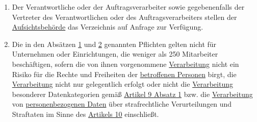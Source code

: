 \begin{enumerate}
  \item Der Verantwortliche oder der Auftragsverarbeiter sowie gegebenenfalls der Vertreter des Verantwortlichen oder
   des Auftragsverarbeiters stellen der \hyperref[itm:04-21]{Aufsichtsbehörde} das Verzeichnis auf Anfrage zur Verfügung.
  \label{itm:30-4}

  \item Die in den Absätzen \hyperref[itm:30-1]{1} und \hyperref[itm:30-2]{2} genannten Pflichten gelten nicht für
   Unternehmen oder Einrichtungen, die weniger als 250 Mitarbeiter beschäftigen, sofern die von ihnen vorgenommene
   \hyperref[itm:04-2]{Verarbeitung} nicht ein Risiko für die Rechte und Freiheiten der \hyperref[itm:04-1]{betroffenen Personen} birgt, die \hyperref[itm:04-2]{Verarbeitung} nicht
   nur gelegentlich erfolgt oder nicht die \hyperref[itm:04-2]{Verarbeitung} besonderer Datenkategorien gemäß \hyperref[itm:09-1]{Artikel 9
   Absatz 1} bzw. die  \hyperref[itm:04-2]{Verarbeitung} von \hyperref[itm:04-1]{personenbezogenen Daten} über strafrechtliche Verurteilungen und Straftaten im
   Sinne des \hyperref[ch:10]{Artikels 10} einschließt.
  \label{itm:30-5}

\end{enumerate}


